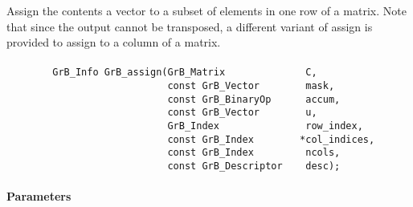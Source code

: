 Assign the contents a vector to a subset of elements in one row of a matrix. 
Note that since the output cannot be transposed, a different variant of
{\sf assign} is provided to assign to a column of a matrix.

\paragraph{\syntax}

\begin{verbatim}
        GrB_Info GrB_assign(GrB_Matrix              C,
                            const GrB_Vector        mask,
                            const GrB_BinaryOp      accum,
                            const GrB_Vector        u,
                            GrB_Index               row_index,
                            const GrB_Index        *col_indices,
                            const GrB_Index         ncols,
                            const GrB_Descriptor    desc); 
\end{verbatim}

\paragraph{Parameters}

